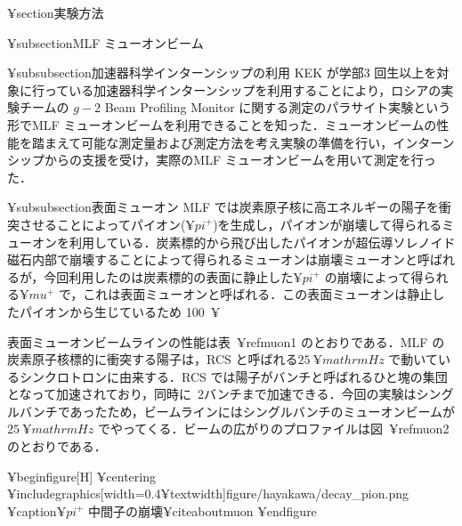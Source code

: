 



%

¥section{実験方法}

¥subsection{MLF ミューオンビーム}

¥subsubsection{加速器科学インターンシップの利用}
KEK が学部3 回生以上を対象に行っている加速器科学インターンシップを利用することにより，ロシアの実験チームの $g - 2$ Beam Profiling Monitor に関する測定のパラサイト実験という形でMLF ミューオンビームを利用できることを知った．ミューオンビームの性能を踏まえて可能な測定量および測定方法を考え実験の準備を行い，インターンシップからの支援を受け，実際のMLF ミューオンビームを用いて測定を行った．

 ¥subsubsection{表面ミューオン}
 MLF では炭素原子核に高エネルギーの陽子を衝突させることによってパイオン($¥pi^{+}$)を生成し，パイオンが崩壊して得られるミューオンを利用している．炭素標的から飛び出したパイオンが超伝導ソレノイド磁石内部で崩壊することによって得られるミューオンは崩壊ミューオンと呼ばれるが，今回利用したのは炭素標的の表面に静止した$¥pi^{+}$ の崩壊によって得られる$¥mu ^{+}$ で，これは表面ミューオンと呼ばれる．この表面ミューオンは静止したパイオンから生じているため 100~¥%

表面ミューオンビームラインの性能は表~¥ref{muon1} のとおりである．MLF の炭素原子核標的に衝突する陽子は，RCS と呼ばれる$25~¥mathrm{Hz}$ で動いているシンクロトロンに由来する．RCS では陽子がバンチと呼ばれるひと塊の集団となって加速されており，同時に~2バンチまで加速できる．今回の実験はシングルバンチであったため，ビームラインにはシングルバンチのミューオンビームが$25~¥mathrm{Hz}$ でやってくる．ビームの広がりのプロファイルは図~¥ref{muon2} のとおりである．

¥begin{figure}[H]
¥centering
¥includegraphics[width=0.4¥textwidth]{figure/hayakawa/decay_pion.png}
¥caption{$¥pi^{+}$ 中間子の崩壊¥cite{aboutmuon}}
¥end{figure}

